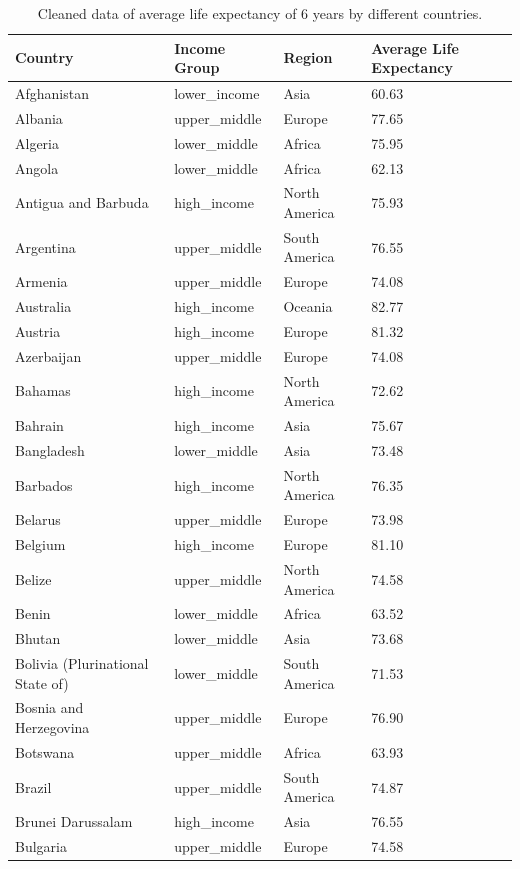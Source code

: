 \documentclass[
  letterpaper,
  DIV=11,
  numbers=noendperiod]{scrartcl}
\begin{document}
\begin{longtable}[t]{llll}

\caption{\label{tbl-cleaned_average}Cleaned data of average life
expectancy of 6 years by different countries.}

\tabularnewline

\toprule
Country & Income Group & Region & Average Life Expectancy\\
\midrule
Afghanistan & lower\_income & Asia & 60.63\\
Albania & upper\_middle & Europe & 77.65\\
Algeria & lower\_middle & Africa & 75.95\\
Angola & lower\_middle & Africa & 62.13\\
Antigua and Barbuda & high\_income & North America & 75.93\\
\addlinespace
Argentina & upper\_middle & South America & 76.55\\
Armenia & upper\_middle & Europe & 74.08\\
Australia & high\_income & Oceania & 82.77\\
Austria & high\_income & Europe & 81.32\\
Azerbaijan & upper\_middle & Europe & 74.08\\
\addlinespace
Bahamas & high\_income & North America & 72.62\\
Bahrain & high\_income & Asia & 75.67\\
Bangladesh & lower\_middle & Asia & 73.48\\
Barbados & high\_income & North America & 76.35\\
Belarus & upper\_middle & Europe & 73.98\\
\addlinespace
Belgium & high\_income & Europe & 81.10\\
Belize & upper\_middle & North America & 74.58\\
Benin & lower\_middle & Africa & 63.52\\
Bhutan & lower\_middle & Asia & 73.68\\
Bolivia (Plurinational State of) & lower\_middle & South America & 71.53\\
\addlinespace
Bosnia and Herzegovina & upper\_middle & Europe & 76.90\\
Botswana & upper\_middle & Africa & 63.93\\
Brazil & upper\_middle & South America & 74.87\\
Brunei Darussalam & high\_income & Asia & 76.55\\
Bulgaria & upper\_middle & Europe & 74.58\\

\end{longtable}
\end{document}
